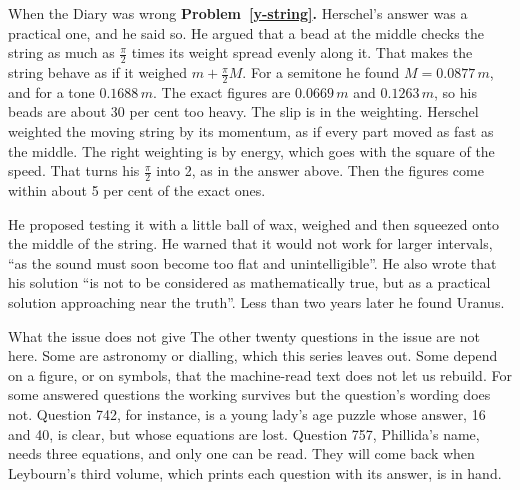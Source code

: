 \documentclass[11pt,a4paper]{article}
\begin{document}
\begin{diarynote}{When the Diary was wrong}
\textbf{Problem~\ref{y-string}.} Herschel's answer was a practical one, and he said so.
He argued that a bead at the middle checks the string as much as $\tfrac\pi2$ times its
weight spread evenly along it. That makes the string behave as if it weighed
$m + \tfrac\pi2 M$. For a semitone he found $M = 0.0877\,m$, and for a tone $0.1688\,m$.
The exact figures are $0.0669\,m$ and $0.1263\,m$, so his beads are about 30 per cent too
heavy. The slip is in the weighting. Herschel weighted the moving string by its
momentum, as if every part moved as fast as the middle. The right weighting is by energy,
which goes with the square of the speed. That turns his $\tfrac\pi2$ into 2, as in the
answer above. Then the figures come within about 5 per cent of the exact ones.

He proposed testing it with a little ball of wax, weighed and then squeezed onto the
middle of the string. He warned that it would not work for larger intervals, ``as the
sound must soon become too flat and unintelligible''. He also wrote that his solution
``is not to be considered as mathematically true, but as a practical solution approaching
near the truth''. Less than two years later he found Uranus.
\end{diarynote}

\begin{diarynote}{What the issue does not give}
The other twenty questions in the issue are not here. Some are astronomy or dialling,
which this series leaves out. Some depend on a figure, or on symbols, that the machine-read text does not let us
rebuild. For some answered questions the working survives but the question's wording does
not. Question 742, for instance, is a young lady's age puzzle whose answer, 16 and 40, is
clear, but whose equations are lost. Question 757, Phillida's name, needs three
equations, and only one can be read. They will come back when Leybourn's third volume,
which prints each question with its answer, is in hand.
\end{diarynote}
\end{document}
